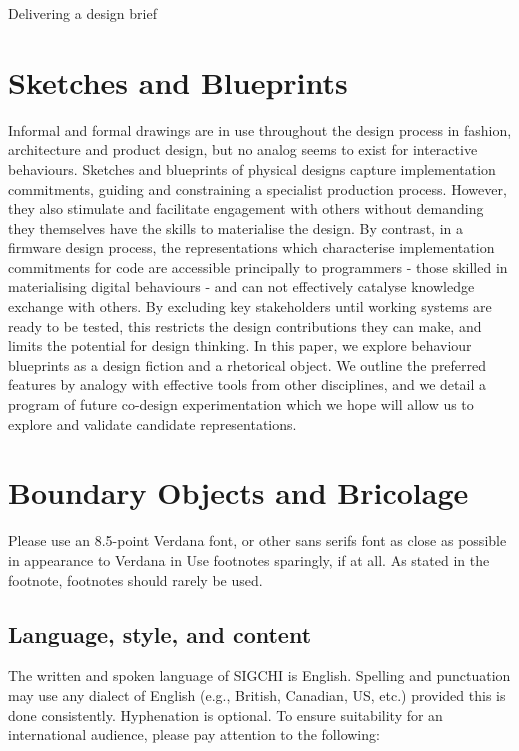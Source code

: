 \documentclass{chi-ext}
\begin{document}
Delivering a design brief 

\section{Sketches and Blueprints}
Informal and formal drawings are in use throughout the design process in fashion, architecture and product design, but no analog seems to exist for interactive behaviours. Sketches and blueprints of physical designs capture implementation commitments, guiding and constraining a specialist production process. However, they also stimulate and facilitate engagement with others without demanding they themselves have the skills to materialise the design. By contrast, in a firmware design process, the representations which characterise implementation commitments for code are accessible principally to programmers - those skilled in materialising digital behaviours - and can not effectively catalyse knowledge exchange with others. By excluding key stakeholders until working systems are ready to be tested, this restricts the design contributions they can make, and limits the potential for design thinking. In this paper, we explore behaviour blueprints as a design fiction and a rhetorical object. We outline the preferred features by analogy with effective tools from other disciplines, and we detail a program of future co-design experimentation which we hope will allow us to explore and validate candidate representations.

\section{Boundary Objects and Bricolage}
Please use an 8.5-point Verdana font, or other sans serifs font as close as possible in appearance to Verdana in {Use footnotes sparingly, if at all.}
As stated in the footnote, footnotes should rarely be used.

\subsection{Language, style, and content}
The written and spoken language of SIGCHI is English. 
Spelling and punctuation may use any dialect of English (e.g., British, Canadian, US, etc.) provided this is done consistently. 
Hyphenation is optional. 
To ensure suitability for an international audience, please pay attention to the following:
\end{document}
